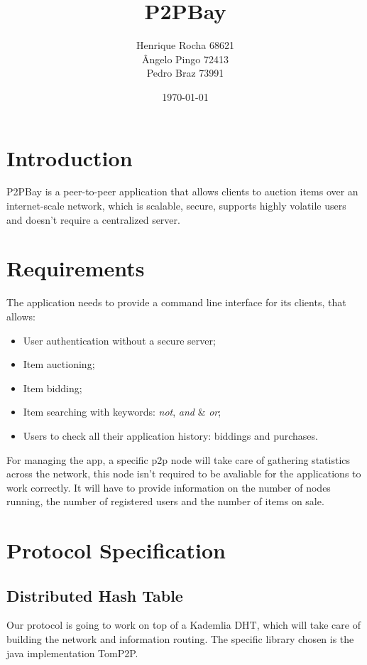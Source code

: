 \documentclass[a4paper]{article}
\title{P2PBay}
\author{Henrique Rocha 68621\\
Ângelo Pingo 72413\\
Pedro Braz 73991}
\date{\today}
\begin{document}
\maketitle



\section{Introduction}
 P2PBay is a peer-to-peer application that allows clients to auction items over an internet-scale network, which is scalable, secure, supports highly volatile users and doesn't require a centralized server. 

\section{Requirements}
	The application needs to provide a command line interface for its clients, that allows:  
    \begin{itemize}
        \item User authentication without a secure server;
        \item Item auctioning;
        \item Item bidding;
        \item Item searching with keywords: \textit{not}, \textit{and} \& \textit{or};
        \item Users to check all their application history: biddings and purchases.
    \end{itemize}
    For managing the app, a specific p2p node will take care of gathering statistics across the network, this node isn't required to be avaliable for the applications to work correctly. It will have to provide information on the number of nodes running, the number of registered users and the number of items on sale.



\section{Protocol Specification}

\subsection{Distributed Hash Table}
	Our protocol is going to work on top of a Kademlia DHT, which will take care of building the network and information routing. The specific library chosen is the java implementation TomP2P.
\end{document}
